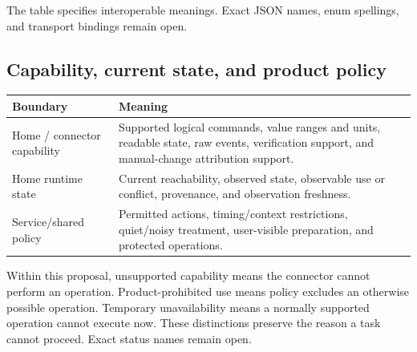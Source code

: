 The table specifies interoperable meanings. Exact JSON names, enum spellings,
and transport bindings remain open. 

\subsection{Capability, current state, and product policy}


{\small
\begin{tabularx}{\textwidth}{@{}L{0.25\textwidth}Y@{}}
\toprule
\textbf{Boundary} & \textbf{Meaning} \\
\midrule
Home / connector capability & Supported logical commands, value ranges and
units, readable state, raw events, verification support, and manual-change
attribution support. \\
Home runtime state & Current reachability, observed state, observable use or
conflict, provenance, and observation freshness. \\
Service/shared policy & Permitted actions, timing/context restrictions,
quiet/noisy treatment, user-visible preparation, and protected operations. \\
\bottomrule
\end{tabularx}
\par
}

Within this proposal, unsupported capability means the connector cannot
perform an operation. Product-prohibited use means policy excludes an otherwise
possible operation. Temporary unavailability means a normally supported
operation cannot execute now. These distinctions preserve the reason a task
cannot proceed. Exact status names remain open. 
